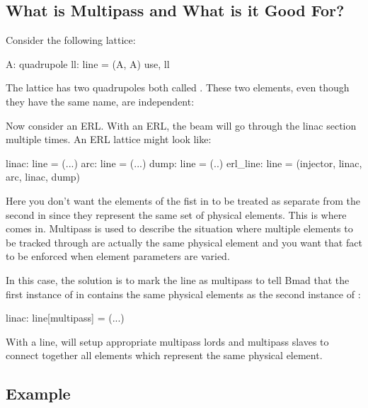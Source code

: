 \documentclass{hitec}     %
\begin{document}
{%
\subsection{What is Multipass and What is it Good For?}

Consider the following lattice:
\begin{code}
A: quadrupole
ll: line = (A, A)
use, ll
\end{code}
The lattice has two quadrupoles both called . These two elements, even though they have the
same name, are independent:
Now consider an ERL. With an ERL, the beam will go through the linac section multiple times. An ERL
lattice might look like:
\begin{code}
linac: line = (...)
arc: line = (...)
dump: line = (..)
erl_line: line = (injector, linac, arc, linac, dump)
\end{code}
Here you don't want the elements of the fist  in  to be treated as separate
from the second  in  since they represent the same set of physical elements.
This is where  comes in.  Multipass is used to describe the situation where multiple
elements to be tracked through are actually the same physical element and you want that fact to
be enforced when element parameters are varied.

In this case, the solution is to mark the  line as multipass to tell Bmad that the first
instance of  in  contains the same physical elements as the second instance
of :
\begin{code}
linac: line[multipass] = (...)
\end{code}

With a  line, \bmad will setup appropriate multipass lords and multipass slaves to
connect together all elements which represent the same physical element.

\newpage

\subsection{Example}

}
\end{document}
